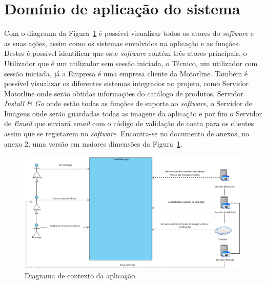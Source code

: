 \section{Domínio de aplicação do sistema}

Com o diagrama da Figura~\ref{fig:2} é possível visualizar todos os atores do \textit{software} e as suas ações, assim como os sistemas envolvidos na aplicação e as funções.
Destes é possível identificar que este \textit{software} contém três atores principais, o Utilizador que é um utilizador sem sessão iniciada, o Técnico, um utilizador com sessão iniciada, já a Empresa é uma empresa cliente da Motorline. Também é possível visualizar os diferentes sistemas integrados no projeto, como Servidor Motorline onde serão obtidas informações do catálogo de produtos, Servidor \textit{Install \& Go} onde estão todas as funções de suporte ao \textit{software}, o Servidor de Imagens onde serão guardadas todas as imagens da aplicação e por fim o Servidor de \textit{Email} que enviará \textit{email} com o código de validação de conta para os clientes assim que se registarem no \textit{software}. Encontra-se no documento de anexos, no anexo 2, uma versão em maiores dimensões da Figura~\ref*{fig:2}.


\begin{figure}[htb]
  \centering
  
  \includegraphics[width=\textwidth]{images/diagramas/diagrama_contexto.png}
  \caption{Diagrama de contexto da aplicação}
  \label{fig:2}
\end{figure}